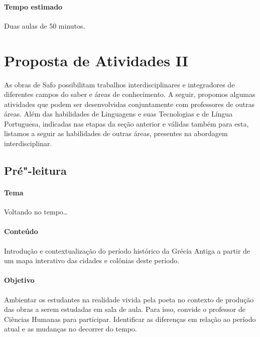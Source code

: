 \documentclass[12pt]{extarticle}
\begin{document}




\paragraph{Tempo estimado} Duas aulas de 50 minutos.



\section{Proposta de Atividades II}

As obras de Safo possibilitam trabalhos interdisciplinares e
integradores de diferentes campos do saber e áreas de conhecimento. A
seguir, propomos algumas atividades que podem ser desenvolvidas
conjuntamente com professores de outras áreas. Além das habilidades de
Linguagens e suas Tecnologias e de Língua Portuguesa, indicadas nas
etapas da seção anterior e válidas também para esta, listamos a seguir
as habilidades de outras áreas, presentes na abordagem interdisciplinar.

\subsection{Pré"-leitura}

\paragraph{Tema} Voltando no tempo{}\dots{}

\paragraph{Conteúdo} Introdução e contextualização do período histórico
da Grécia Antiga a partir de um mapa interativo das cidades e colônias 
deste período.

\paragraph{Objetivo} Ambientar os estudantes na realidade vivida pela
poeta no contexto de produção das obras a serem estudadas em sala de aula. 
Para isso, convide o professor de Ciências Humanas para participar.
Identificar as diferenças em relação ao período atual e as mudanças no decorrer
do tempo.
\end{document}
